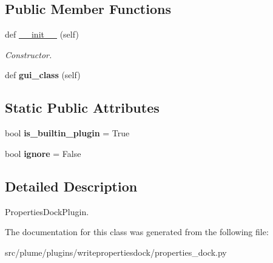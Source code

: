\subsection*{Public Member Functions}
\begin{DoxyCompactItemize}
\item 
def \hyperlink{classplume-creator_1_1src_1_1plume_1_1plugins_1_1writepropertiesdock_1_1properties__dock_1_1_write_properties_dock_plugin_a0cb85e9b16ef73f628a683467181f84a}{\+\_\+\+\_\+init\+\_\+\+\_\+} (self)\hypertarget{classplume-creator_1_1src_1_1plume_1_1plugins_1_1writepropertiesdock_1_1properties__dock_1_1_write_properties_dock_plugin_a0cb85e9b16ef73f628a683467181f84a}{}\label{classplume-creator_1_1src_1_1plume_1_1plugins_1_1writepropertiesdock_1_1properties__dock_1_1_write_properties_dock_plugin_a0cb85e9b16ef73f628a683467181f84a}

\begin{DoxyCompactList}\small\item\em Constructor. \end{DoxyCompactList}\item 
def {\bfseries gui\+\_\+class} (self)\hypertarget{classplume-creator_1_1src_1_1plume_1_1plugins_1_1writepropertiesdock_1_1properties__dock_1_1_write_properties_dock_plugin_a74fea32e6c0efc74633662d505e3f062}{}\label{classplume-creator_1_1src_1_1plume_1_1plugins_1_1writepropertiesdock_1_1properties__dock_1_1_write_properties_dock_plugin_a74fea32e6c0efc74633662d505e3f062}

\end{DoxyCompactItemize}
\subsection*{Static Public Attributes}
\begin{DoxyCompactItemize}
\item 
bool {\bfseries is\+\_\+builtin\+\_\+plugin} = True\hypertarget{classplume-creator_1_1src_1_1plume_1_1plugins_1_1writepropertiesdock_1_1properties__dock_1_1_write_properties_dock_plugin_af088b1ca181c781223564dba72f52563}{}\label{classplume-creator_1_1src_1_1plume_1_1plugins_1_1writepropertiesdock_1_1properties__dock_1_1_write_properties_dock_plugin_af088b1ca181c781223564dba72f52563}

\item 
bool {\bfseries ignore} = False\hypertarget{classplume-creator_1_1src_1_1plume_1_1plugins_1_1writepropertiesdock_1_1properties__dock_1_1_write_properties_dock_plugin_aaa2074f8e91c659f80b29069438fc13c}{}\label{classplume-creator_1_1src_1_1plume_1_1plugins_1_1writepropertiesdock_1_1properties__dock_1_1_write_properties_dock_plugin_aaa2074f8e91c659f80b29069438fc13c}

\end{DoxyCompactItemize}


\subsection{Detailed Description}
Properties\+Dock\+Plugin. 

The documentation for this class was generated from the following file\+:\begin{DoxyCompactItemize}
\item 
src/plume/plugins/writepropertiesdock/properties\+\_\+dock.\+py\end{DoxyCompactItemize}
